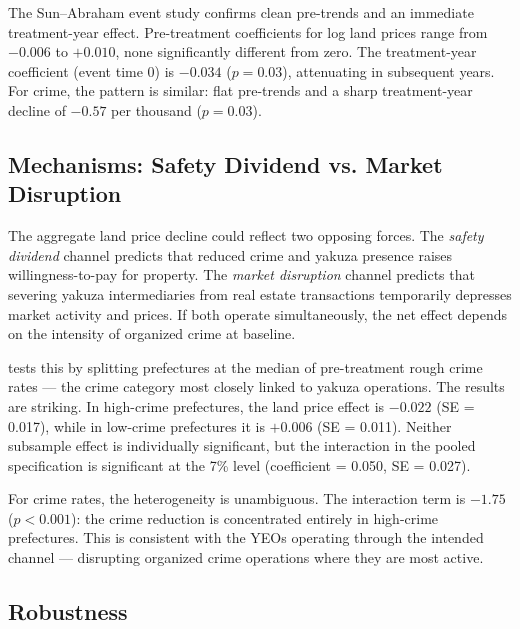 \documentclass[12pt]{article}
\begin{document}
The Sun--Abraham event study confirms clean pre-trends and an immediate treatment-year effect. Pre-treatment coefficients for log land prices range from $-0.006$ to $+0.010$, none significantly different from zero. The treatment-year coefficient (event time 0) is $-0.034$ ($p = 0.03$), attenuating in subsequent years. For crime, the pattern is similar: flat pre-trends and a sharp treatment-year decline of $-0.57$ per thousand ($p = 0.03$).

\subsection{Mechanisms: Safety Dividend vs. Market Disruption}



The aggregate land price decline could reflect two opposing forces. The \textit{safety dividend} channel predicts that reduced crime and yakuza presence raises willingness-to-pay for property. The \textit{market disruption} channel predicts that severing yakuza intermediaries from real estate transactions temporarily depresses market activity and prices. If both operate simultaneously, the net effect depends on the intensity of organized crime at baseline.

 tests this by splitting prefectures at the median of pre-treatment rough crime rates --- the crime category most closely linked to yakuza operations. The results are striking. In high-crime prefectures, the land price effect is $-0.022$ (SE = 0.017), while in low-crime prefectures it is $+0.006$ (SE = 0.011). Neither subsample effect is individually significant, but the interaction in the pooled specification is significant at the 7\% level (coefficient = 0.050, SE = 0.027).

For crime rates, the heterogeneity is unambiguous. The interaction term is $-1.75$ ($p < 0.001$): the crime reduction is concentrated entirely in high-crime prefectures. This is consistent with the YEOs operating through the intended channel --- disrupting organized crime operations where they are most active.

\subsection{Robustness}


\end{document}

